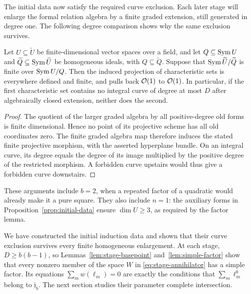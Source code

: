 The initial data now satisfy the required curve exclusion. Each later
stage will enlarge the formal relation algebra by a finite graded
extension, still generated in degree one. The following degree
comparison shows why the same exclusion survives.

\begin{lemma}\label{lem:sparsity-preserved}
Let \(U\subseteq\widetilde U\) be finite-dimensional vector spaces
over a field, and let \(Q\subseteq\operatorname{Sym} U\) and
\(\widetilde Q\subseteq\operatorname{Sym}\widetilde U\) be homogeneous ideals,
with \(Q\subseteq\widetilde Q\).
Suppose that \(\operatorname{Sym}\widetilde U/\widetilde Q\) is finite over
\(\operatorname{Sym} U/Q\). Then the induced projection of characteristic sets
is everywhere defined and finite, and pulls back \(\mathcal O(1)\) to
\(\mathcal O(1)\). In particular, if the first characteristic set contains
no integral curve of degree at most \(D\) after algebraically
closed extension, neither does the second.
\end{lemma}

\begin{proof}
The quotient of the larger graded algebra by all positive-degree
old forms is finite dimensional. Hence no point of its projective
scheme has all old coordinates zero. The finite graded algebra
map therefore induces the stated finite projective morphism,
with the asserted hyperplane bundle. On an integral curve, its
degree equals the degree of its image multiplied by the positive
degree of the restricted morphism. A forbidden curve upstairs
would thus give a forbidden curve downstairs.
\end{proof}

These arguments include \(b=2\), when a repeated factor of a quadratic
would already make it a pure square. They also include \(n=1\):
the auxiliary forms in Proposition~\ref{prop:initial-data} ensure
\(\dim U\ge3\), as required by the factor lemma.

We have constructed the initial induction data and shown that their
curve exclusion survives every finite homogeneous enlargement.
At each stage, \(D\ge b(b-1)\), so Lemmas~\ref{lem:stage-basepoint}
and~\ref{lem:simple-factor} show that every nonzero member of the
space \(W\) in \eqref{eq:stage-annihilator} has a simple factor.
Its equations \(\sum_m w(\ell_m)=0\) are exactly the conditions that
\(\sum_m\ell_m^b\) belong to \(\mathfrak j_b\).
The next section studies their parameter complete intersection.
